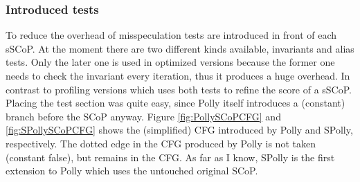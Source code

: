 \orange
\begin{shaded}
\subsubsection{Introduced tests}
To reduce the overhead of misspeculation tests are introduced in front of
each sSCoP. At the moment there are two different kinds available, 
invariants and alias tests. Only the later one is used in optimized 
versions because the former one needs to check the invariant
every iteration, thus it produces a huge overhead. In contrast to profiling 
versions which uses both tests to refine the score of a sSCoP.
Placing the test section was quite easy, since
Polly itself introduces a (constant) branch before the SCoP anyway. Figure
\ref{fig:PollySCoPCFG} and \ref{fig:SPollySCoPCFG} shows the (simplified) 
CFG introduced by Polly and SPolly, respectively. The dotted edge in the CFG
produced by Polly is not taken (constant false), but remains in the CFG. As far
as I know, SPolly is the first extension to Polly which uses the untouched 
original SCoP.

\end{shaded}

